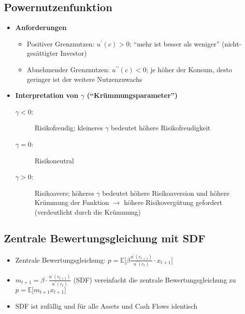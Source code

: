 \subsection{Powernutzenfunktion}
\begin{itemize}
	\item \textbf{Anforderungen}
	\begin{itemize}
		\item Positiver Grenznutzen: \(u^\prime(c)>0\); "`mehr ist besser als weniger"' (nicht-gesättigter Investor)
		\item Abnehmender Grenznutzen: \(u^{\prime\prime}(c)<0\); je höher der Konsum, desto geringer ist der weitere Nutzenzuwachs
	\end{itemize}
	\item \textbf{Interpretation von \(\gamma\) ("`Krümmungsparameter"')}
	\begin{description}
		\item[\(\gamma<0\):] Risikofreudig; kleineres \(\gamma\) bedeutet höhere Risikofreudigkeit
		\item[\(\gamma=0\):] Risikoneutral
		\item[\(\gamma>0\):] Risikoavers; höheres \(\gamma\) bedeutet höhere Risikoaversion und höhere Krümmung der Funktion \(\rightarrow\) höhere Risikovergütung gefordert (verdeutlicht durch die Krümmung)
	\end{description}
\end{itemize}

\subsection{Zentrale Bewertungsgleichung mit SDF}
\begin{itemize}
	\item Zentrale Bewertungsgleichung: \(p=\mathbb{E} \big\lbrack \beta \frac{u^\prime(c_{t+1})}{u^\prime(c_t)} \cdot x_{t+1} \big\rbrack\)
	\item \(m_{t+1} = \beta \cdot \frac{u^\prime(c_{t+1})}{u^\prime(c_t)}\) (SDF) vereinfacht die zentrale Bewertungsgleichung zu \(p=\mathbb{E} \big\lbrack m_{t+1} x_{t+1} \big\rbrack\)
	\item SDF ist zufällig und für alle Assets und Cash Flows identisch
\end{itemize}


